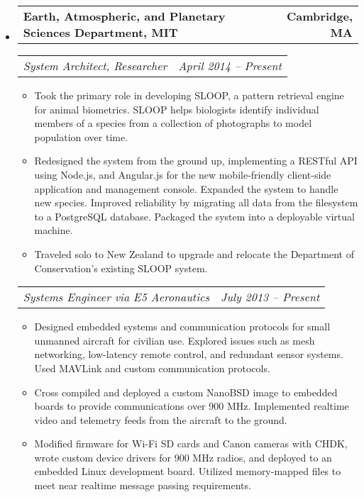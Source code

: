 \documentclass[10pt,letterpaper]{article}
\makeatletter
\newcommand{\headerrow}[2]
{\begin{tabular*}{\linewidth}{l@{\extracolsep{\fill}}r}
	#1 & #2 \\
\end{tabular*}}
\makeatother
\begin{document}
\begin{itemize}
	\parskip=0.1em
    \item
    \headerrow
        {\textbf{Earth, Atmospheric, and Planetary Sciences Department, MIT}}
        {\textbf{Cambridge, MA}}
    \headerrow
        {\emph{System Architect, Researcher}}
        {\emph{April 2014 -- Present}}
    \begin{itemize}
        \item Took the primary role in developing SLOOP, a pattern retrieval
            engine for animal biometrics.  SLOOP helps biologists identify
            individual members of a species from a collection of photographs to
            model population over time.

        \item Redesigned the system from the ground up, implementing a RESTful
            API using Node.js, and Angular.js for the new mobile-friendly
            client-side application and management console. Expanded the system
            to handle new species.  Improved reliability by migrating all data
            from the filesystem to a PostgreSQL database.  Packaged the system
            into a deployable virtual machine.

        \item Traveled solo to New Zealand to upgrade and relocate the
            Department of Conservation's existing SLOOP system.

    \end{itemize}

    \headerrow
		{\emph{Systems Engineer via E5 Aeronautics}}
		{\emph{July 2013 -- Present}}
    \begin{itemize}
        \item Designed embedded systems and communication protocols for small
            unmanned aircraft for civilian use.  Explored
            issues such as mesh networking, low-latency remote control, and
            redundant sensor systems.  Used MAVLink and custom communication
            protocols.

        \item Cross compiled and deployed a custom NanoBSD image to embedded
            boards to provide communications over 900 MHz.  Implemented
            realtime video and telemetry feeds from the aircraft to the ground.

        \item Modified firmware for Wi-Fi SD cards and Canon cameras with CHDK,
            wrote custom device drivers for 900 MHz radios, and deployed to an
            embedded Linux development board.  Utilized memory-mapped files to
            meet near realtime message passing requirements.


\end{itemize}
\end{itemize}
\end{document}
